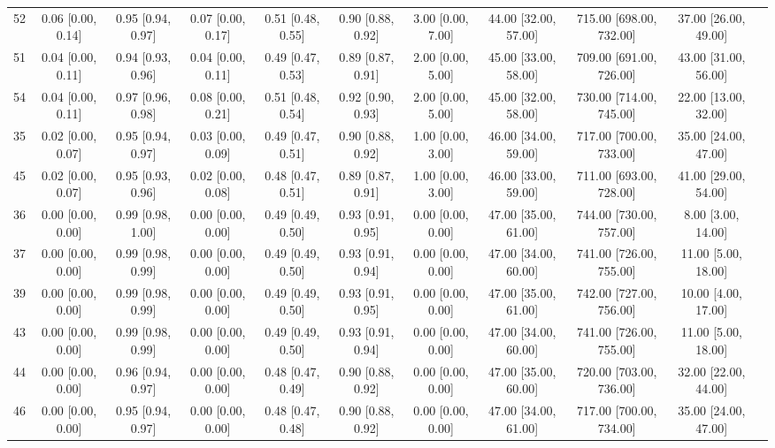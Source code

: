 \documentclass[8pt]{article}
\begin{document}
\begin{center}
\begin{footnotesize}
\begin{longtable}{|ccccccccccc|}
 52 &  0.06 [0.00, 0.14] &  0.95 [0.94, 0.97] &  0.07 [0.00, 0.17] &  0.51 [0.48, 0.55] &  0.90 [0.88, 0.92] &     3.00 [0.00, 7.00] &  44.00 [32.00, 57.00] &  715.00 [698.00, 732.00] &     37.00 [26.00, 49.00] \\
 51 &  0.04 [0.00, 0.11] &  0.94 [0.93, 0.96] &  0.04 [0.00, 0.11] &  0.49 [0.47, 0.53] &  0.89 [0.87, 0.91] &     2.00 [0.00, 5.00] &  45.00 [33.00, 58.00] &  709.00 [691.00, 726.00] &     43.00 [31.00, 56.00] \\
 54 &  0.04 [0.00, 0.11] &  0.97 [0.96, 0.98] &  0.08 [0.00, 0.21] &  0.51 [0.48, 0.54] &  0.92 [0.90, 0.93] &     2.00 [0.00, 5.00] &  45.00 [32.00, 58.00] &  730.00 [714.00, 745.00] &     22.00 [13.00, 32.00] \\
 35 &  0.02 [0.00, 0.07] &  0.95 [0.94, 0.97] &  0.03 [0.00, 0.09] &  0.49 [0.47, 0.51] &  0.90 [0.88, 0.92] &     1.00 [0.00, 3.00] &  46.00 [34.00, 59.00] &  717.00 [700.00, 733.00] &     35.00 [24.00, 47.00] \\
 45 &  0.02 [0.00, 0.07] &  0.95 [0.93, 0.96] &  0.02 [0.00, 0.08] &  0.48 [0.47, 0.51] &  0.89 [0.87, 0.91] &     1.00 [0.00, 3.00] &  46.00 [33.00, 59.00] &  711.00 [693.00, 728.00] &     41.00 [29.00, 54.00] \\
 36 &  0.00 [0.00, 0.00] &  0.99 [0.98, 1.00] &  0.00 [0.00, 0.00] &  0.49 [0.49, 0.50] &  0.93 [0.91, 0.95] &     0.00 [0.00, 0.00] &  47.00 [35.00, 61.00] &  744.00 [730.00, 757.00] &       8.00 [3.00, 14.00] \\
 37 &  0.00 [0.00, 0.00] &  0.99 [0.98, 0.99] &  0.00 [0.00, 0.00] &  0.49 [0.49, 0.50] &  0.93 [0.91, 0.94] &     0.00 [0.00, 0.00] &  47.00 [34.00, 60.00] &  741.00 [726.00, 755.00] &      11.00 [5.00, 18.00] \\
 39 &  0.00 [0.00, 0.00] &  0.99 [0.98, 0.99] &  0.00 [0.00, 0.00] &  0.49 [0.49, 0.50] &  0.93 [0.91, 0.95] &     0.00 [0.00, 0.00] &  47.00 [35.00, 61.00] &  742.00 [727.00, 756.00] &      10.00 [4.00, 17.00] \\
 43 &  0.00 [0.00, 0.00] &  0.99 [0.98, 0.99] &  0.00 [0.00, 0.00] &  0.49 [0.49, 0.50] &  0.93 [0.91, 0.94] &     0.00 [0.00, 0.00] &  47.00 [34.00, 60.00] &  741.00 [726.00, 755.00] &      11.00 [5.00, 18.00] \\
 44 &  0.00 [0.00, 0.00] &  0.96 [0.94, 0.97] &  0.00 [0.00, 0.00] &  0.48 [0.47, 0.49] &  0.90 [0.88, 0.92] &     0.00 [0.00, 0.00] &  47.00 [35.00, 60.00] &  720.00 [703.00, 736.00] &     32.00 [22.00, 44.00] \\
 46 &  0.00 [0.00, 0.00] &  0.95 [0.94, 0.97] &  0.00 [0.00, 0.00] &  0.48 [0.47, 0.48] &  0.90 [0.88, 0.92] &     0.00 [0.00, 0.00] &  47.00 [34.00, 61.00] &  717.00 [700.00, 734.00] &     35.00 [24.00, 47.00] \\

\end{longtable}
\end{footnotesize}
\end{center}
\end{document}
